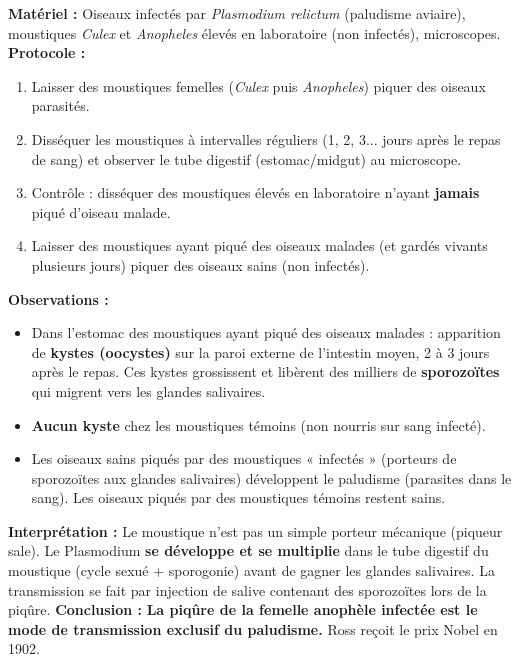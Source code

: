 \documentclass[11pt]{article}
\begin{document}
\begin{experience}
\textbf{Matériel :} Oiseaux infectés par \emph{Plasmodium relictum} (paludisme aviaire), moustiques \emph{Culex} et \emph{Anopheles} élevés en laboratoire (non infectés), microscopes.
\textbf{Protocole :}
\begin{enumerate}
    \item Laisser des moustiques femelles (\emph{Culex} puis \emph{Anopheles}) piquer des oiseaux parasités.
    \item Disséquer les moustiques à intervalles réguliers (1, 2, 3... jours après le repas de sang) et observer le tube digestif (estomac/midgut) au microscope.
    \item Contrôle : disséquer des moustiques élevés en laboratoire n'ayant \textbf{jamais} piqué d'oiseau malade.
    \item Laisser des moustiques ayant piqué des oiseaux malades (et gardés vivants plusieurs jours) piquer des oiseaux sains (non infectés).
\end{enumerate}
\textbf{Observations :}
\begin{itemize}
    \item Dans l'estomac des moustiques ayant piqué des oiseaux malades : apparition de \textbf{kystes (oocystes)} sur la paroi externe de l'intestin moyen, 2 à 3 jours après le repas. Ces kystes grossissent et libèrent des milliers de \textbf{sporozoïtes} qui migrent vers les glandes salivaires.
    \item \textbf{Aucun kyste} chez les moustiques témoins (non nourris sur sang infecté).
    \item Les oiseaux sains piqués par des moustiques « infectés » (porteurs de sporozoïtes aux glandes salivaires) développent le paludisme (parasites dans le sang). Les oiseaux piqués par des moustiques témoins restent sains.
\end{itemize}
\textbf{Interprétation :} Le moustique n'est pas un simple porteur mécanique (piqueur sale). Le Plasmodium \textbf{se développe et se multiplie} dans le tube digestif du moustique (cycle sexué + sporogonie) avant de gagner les glandes salivaires. La transmission se fait par injection de salive contenant des sporozoïtes lors de la piqûre.
\textbf{Conclusion :} \textbf{La piqûre de la femelle anophèle infectée est le mode de transmission exclusif du paludisme.} Ross reçoit le prix Nobel en 1902.
\end{experience}
\end{document}

